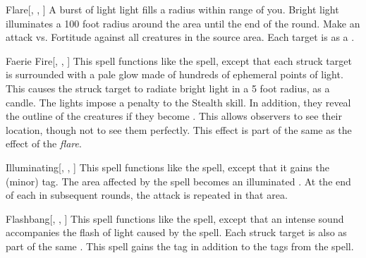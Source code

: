\lowercase{\hypertarget{spell:Flare}{}}\label{spell:Flare}
\begin{freeability}[\nth{1}]{\hypertarget{spell:Flare}{Flare}}[, , ]
A burst of light light fills a \areasmall radius within \rngmed range of you.
Bright light illuminates a 100 foot radius around the area until the end of the round.
Make an attack vs. Fortitude against all creatures in the source area.
\hit Each target is \dazzled as a .
\end{freeability}
\vspace{0.25em}



\lowercase{\hypertarget{spell:Faerie Fire}{}}\label{spell:Faerie Fire}
\begin{freeability}[\nth{2}]{\hypertarget{spell:Faerie Fire}{Faerie Fire}}[, , ]
This spell functions like the  spell, except that each struck target is surrounded with a pale glow made of hundreds of ephemeral points of light.
This causes the struck target to radiate bright light in a 5 foot radius, as a candle.
The lights impose a  penalty to the Stealth skill.
In addition, they reveal the outline of the creatures if they become .
This allows observers to see their location, though not to see them perfectly.
This effect is part of the same  as the effect of the \textit{flare}.
\end{freeability}
\vspace{0.25em}



\lowercase{\hypertarget{spell:Illuminating}{}}\label{spell:Illuminating}
\begin{freeability}[\nth{2}]{\hypertarget{spell:Illuminating}{Illuminating}}[, , ]
This spell functions like the  spell, except that it gains the  (minor) tag.
The area affected by the spell becomes an illuminated .
At the end of each  in subsequent rounds, the attack is repeated in that area.
\end{freeability}
\vspace{0.25em}



\lowercase{\hypertarget{spell:Flashbang}{}}\label{spell:Flashbang}
\begin{freeability}[\nth{3}]{\hypertarget{spell:Flashbang}{Flashbang}}[, , ]
This spell functions like the  spell, except that an intense sound accompanies the flash of light caused by the spell.
Each struck target is also  as part of the same .
This spell gains the  tag in addition to the tags from the  spell.
\end{freeability}
\vspace{0.25em}



